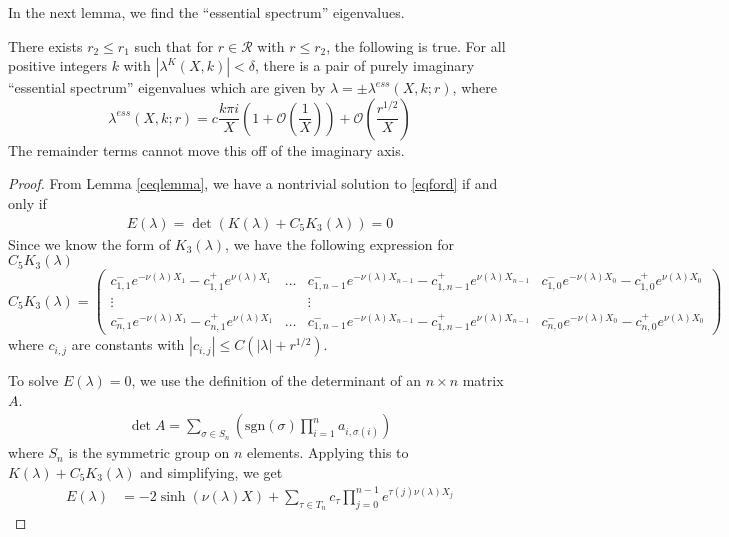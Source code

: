 \documentclass[thesis.tex]{subfiles}
\begin{document}
In the next lemma, we find the ``essential spectrum'' eigenvalues.
\begin{lemma}\label{essspeclemma}
There exists $r_2 \leq r_1$ such that for $r \in \mathcal{R}$ with $r \leq r_2$, the following is true. For all positive integers $k$ with $|\lambda^K(X,k)| < \delta$, there is a pair of purely imaginary ``essential spectrum'' eigenvalues which are given by $\lambda = \pm \lambda^{ess}(X,k; r)$, where
\begin{equation}\label{lambdaess}
\lambda^{ess}(X, k; r) = c \frac{k \pi i }{X} \left( 1 + \mathcal{O}\left( \frac{1}{X} \right)\right) + \mathcal{O}\left( \frac{r^{1/2}}{X} \right)
\end{equation}
The remainder terms cannot move this off of the imaginary axis.

\begin{proof}
From Lemma \ref{ceqlemma}, we have a nontrivial solution to \eqref{eqford} if and only if 
\begin{align*}
E(\lambda) = \det (K(\lambda) + C_5 K_3(\lambda)) = 0
\end{align*}
Since we know the form of $K_3(\lambda)$, we have the following expression for $C_5 K_3(\lambda)$
\[
C_5 K_3(\lambda) = 
\begin{pmatrix}
c_{1,1}^- e^{-\nu(\lambda)X_1} - c_{1,1}^+ e^{\nu(\lambda)X_1} 
& \dots & 
c_{1, n-1}^- e^{-\nu(\lambda)X_{n-1}} - c_{1,n-1}^+ e^{\nu(\lambda)X_{n-1}} &
c_{1,0}^- e^{-\nu(\lambda)X_0} - c_{1,0}^+ e^{\nu(\lambda)X_0}  \\
\vdots & & \vdots & \\
c_{n,1}^- e^{-\nu(\lambda)X_1} - c_{n,1}^+ e^{\nu(\lambda)X_1}
& \dots & 
c_{1, n-1}^- e^{-\nu(\lambda)X_{n-1}} - c_{1,n-1}^+ e^{\nu(\lambda)X_{n-1}} &
c_{n,0}^- e^{-\nu(\lambda)X_0} - c_{n,0}^+ e^{\nu(\lambda)X_0} 
\end{pmatrix}
\]
where $c_{i,j}$ are constants with $|c_{i,j}| \leq C(|\lambda| + r^{1/2})$. 

To solve $E(\lambda) = 0$, we use the definition of the determinant of an $n \times n$ matrix $A$.
\begin{align*}
\det A = \sum_{\sigma \in S_n} \left( \text{sgn}(\sigma) \prod_{i=1}^n a_{i, \sigma(i)} \right)
\end{align*}
where $S_n$ is the symmetric group on $n$ elements. Applying this to $K(\lambda) + C_5 K_3(\lambda)$ and simplifying, we get
\begin{align}\label{Elambdaess}
E(\lambda)
&= -2 \sinh(\nu(\lambda)X) + \sum_{\tau \in T_n}
c_\tau \prod_{j = 0}^{n-1} e^{\tau(j) \nu(\lambda)X_j}
\end{align}


\end{proof}
\end{lemma}
\end{document}
